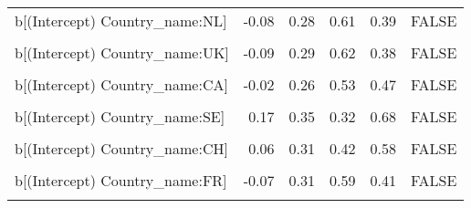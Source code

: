 \begin{table}
\begin{tabular}[t]{lrrrrl}
b[(Intercept) Country\_name:NL] & -0.08 & 0.28 & 0.61 & 0.39 & FALSE\\
\cellcolor{gray!10}{b[EPS Country\_name:NL]} & \cellcolor{gray!10}{-0.10} & \cellcolor{gray!10}{0.11} & \cellcolor{gray!10}{0.81} & \cellcolor{gray!10}{0.19} & \cellcolor{gray!10}{FALSE}\\
b[(Intercept) Country\_name:UK] & -0.09 & 0.29 & 0.62 & 0.38 & FALSE\\
\cellcolor{gray!10}{b[EPS Country\_name:UK]} & \cellcolor{gray!10}{-0.12} & \cellcolor{gray!10}{0.11} & \cellcolor{gray!10}{0.86} & \cellcolor{gray!10}{0.14} & \cellcolor{gray!10}{FALSE}\\
b[(Intercept) Country\_name:CA] & -0.02 & 0.26 & 0.53 & 0.47 & FALSE\\
\cellcolor{gray!10}{b[EPS Country\_name:CA]} & \cellcolor{gray!10}{-0.03} & \cellcolor{gray!10}{0.11} & \cellcolor{gray!10}{0.60} & \cellcolor{gray!10}{0.40} & \cellcolor{gray!10}{FALSE}\\
b[(Intercept) Country\_name:SE] & 0.17 & 0.35 & 0.32 & 0.68 & FALSE\\
\cellcolor{gray!10}{b[EPS Country\_name:SE]} & \cellcolor{gray!10}{0.23} & \cellcolor{gray!10}{0.12} & \cellcolor{gray!10}{0.03} & \cellcolor{gray!10}{0.97} & \cellcolor{gray!10}{TRUE}\\
b[(Intercept) Country\_name:CH] & 0.06 & 0.31 & 0.42 & 0.58 & FALSE\\
\cellcolor{gray!10}{b[EPS Country\_name:CH]} & \cellcolor{gray!10}{0.08} & \cellcolor{gray!10}{0.11} & \cellcolor{gray!10}{0.24} & \cellcolor{gray!10}{0.76} & \cellcolor{gray!10}{FALSE}\\
b[(Intercept) Country\_name:FR] & -0.07 & 0.31 & 0.59 & 0.41 & FALSE\\
\cellcolor{gray!10}{b[EPS Country\_name:FR]} & \cellcolor{gray!10}{-0.12} & \cellcolor{gray!10}{0.11} & \cellcolor{gray!10}{0.86} & \cellcolor{gray!10}{0.14} & \cellcolor{gray!10}{FALSE}\\
\bottomrule
\end{tabular}
\end{table}
